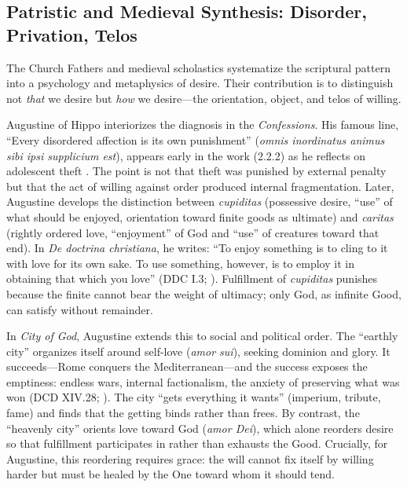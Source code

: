 \subsection*{Patristic and Medieval Synthesis: Disorder, Privation, Telos}
\label{ssec:iii-patristic-medieval}

The Church Fathers and medieval scholastics systematize the scriptural pattern into a
psychology and metaphysics of desire. Their contribution is to distinguish not \emph{that} we
desire but \emph{how} we desire---the orientation, object, and telos of willing.

Augustine of Hippo interiorizes the diagnosis in the \emph{Confessions}. His famous line,
``Every disordered affection is its own punishment'' (\emph{omnis inordinatus animus sibi ipsi
	supplicium est}), appears early in the work (2.2.2) as he reflects on adolescent theft
\parencite[p.~47]{AugustineConfessions1998}. The point is not that theft was punished by
external penalty but that the act of willing against order produced internal fragmentation.
Later, Augustine develops the distinction between \emph{cupiditas} (possessive desire, ``use''
of what should be enjoyed, orientation toward finite goods as ultimate) and \emph{caritas}
(rightly ordered love, ``enjoyment'' of God and ``use'' of creatures toward that end). In
\emph{De doctrina christiana}, he writes: ``To enjoy something is to cling to it with love for
its own sake. To use something, however, is to employ it in obtaining that which you love''
(DDC I.3; \parencite[p.~9]{AugustineDeDoctrina1958}). Fulfillment of \emph{cupiditas}
punishes because the finite cannot bear the weight of ultimacy; only God, as infinite Good,
can satisfy without remainder.

In \emph{City of God}, Augustine extends this to social and political order. The ``earthly
city'' organizes itself around self-love (\emph{amor sui}), seeking dominion and glory. It
succeeds---Rome conquers the Mediterranean---and the success exposes the emptiness: endless
wars, internal factionalism, the anxiety of preserving what was won (DCD XIV.28;
\parencite{AugustineCity2003}). The city ``gets everything it wants'' (imperium, tribute,
fame) and finds that the getting binds rather than frees. By contrast, the ``heavenly city''
orients love toward God (\emph{amor Dei}), which alone reorders desire so that fulfillment
participates in rather than exhausts the Good. Crucially, for Augustine, this reordering
requires grace: the will cannot fix itself by willing harder but must be healed by the One
toward whom it should tend.

